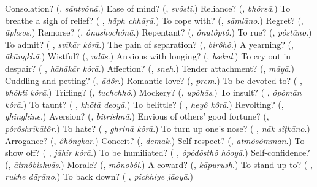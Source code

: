 \begin{tcolorbox}[breakable,colback=teal!4,colframe=teal!35!black,title={Before you move on}]
Consolation? (\textbf{}, \emph{sāntvônā}.) Ease of mind? (\textbf{}, \emph{svôsti}.) Reliance? (\textbf{}, \emph{bhôrsā}.) To breathe a sigh of relief? (\textbf{ }, \emph{hā̃ph chhāṛā}.) To cope with? (\textbf{}, \emph{sāmlāno}.) Regret? (\textbf{}, \emph{āphsos}.) Remorse? (\textbf{}, \emph{ônushochônā}.) Repentant? (\textbf{}, \emph{ônutôptô}.) To rue? (\textbf{}, \emph{pôstāno}.) To admit? (\textbf{ }, \emph{svīkār kôrā}.) The pain of separation? (\textbf{}, \emph{birôhô}.) A yearning? (\textbf{}, \emph{ākāngkhā}.) Wistful? (\textbf{}, \emph{udās}.) Anxious with longing? (\textbf{}, \emph{bækul}.) To cry out in despair? (\textbf{ }, \emph{hāhākār kôrā}.) Affection? (\textbf{}, \emph{sneh}.) Tender attachment? (\textbf{}, \emph{māyā}.) Cuddling and petting? (\textbf{}, \emph{ādôr}.) Romantic love? (\textbf{}, \emph{prem}.) To be devoted to? (\textbf{ }, \emph{bhôkti kôrā}.) Trifling? (\textbf{}, \emph{tuchchhô}.) Mockery? (\textbf{}, \emph{upôhās}.) To insult? (\textbf{ }, \emph{ôpômān kôrā}.) To taunt? (\textbf{ }, \emph{khõṭā deoyā}.) To belittle? (\textbf{ }, \emph{heyô kôrā}.) Revolting? (\textbf{}, \emph{ghinghine}.) Aversion? (\textbf{}, \emph{bitrishnā}.) Envious of others' good fortune? (\textbf{}, \emph{pôrôshrīkātôr}.) To hate? (\textbf{ }, \emph{ghrinā kôrā}.) To turn up one's nose? (\textbf{ }, \emph{nāk sĩṭkāno}.) Arrogance? (\textbf{}, \emph{ôhôngkār}.) Conceit? (\textbf{}, \emph{demāk}.) Self-respect? (\textbf{}, \emph{ātmôsômmān}.) To show off? (\textbf{ }, \emph{jāhir kôrā}.) To be humiliated? (\textbf{ }, \emph{ôpôdôsthô hôoyā}.) Self-confidence? (\textbf{}, \emph{ātmôbishvās}.) Morale? (\textbf{}, \emph{mônobôl}.) A coward? (\textbf{}, \emph{kāpurush}.) To stand up to? (\textbf{ }, \emph{rukhe dā̃ṛāno}.) To back down? (\textbf{ }, \emph{pichhiye jāoyā}.)
\end{tcolorbox}
